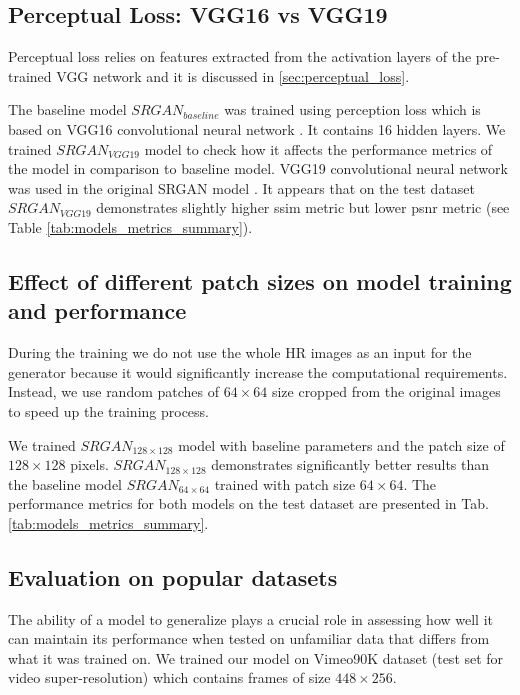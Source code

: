 \documentclass[conference]{IEEEtran}
\begin{document}
\subsection{Perceptual Loss: VGG16 vs VGG19 \label{sec:vgg_16_vs_19}}

Perceptual loss relies on features extracted from the activation layers of the pre-trained VGG network and it is discussed in \ref{sec:perceptual_loss}.

The baseline model $SRGAN_{baseline}$ was trained using perception loss which is based on VGG16 convolutional neural network \cite{vgg_very_deep_cnn_2014}. It contains 16 hidden layers. We trained $SRGAN_{VGG19}$ model to check how it affects the performance metrics of the model in comparison to baseline model. VGG19 convolutional neural network was used in the original SRGAN model \cite{srgan_2016}. It appears that on the test dataset\newline $SRGAN_{VGG19}$ demonstrates slightly higher \acrshort{ssim} metric but lower \acrshort{psnr} metric (see Table \ref{tab:models_metrics_summary}).

\subsection{Effect of different patch sizes on model training and performance}

During the training we do not use the whole HR images as an input for the generator because it would significantly increase the computational requirements. Instead, we use random patches of $64 \times 64$ size cropped from the original images to speed up the training process.

We trained $SRGAN_{128 \times 128}$ model with baseline parameters and the patch size of $128 \times 128$ pixels.  $SRGAN_{128 \times 128}$ demonstrates significantly better results than the baseline model $SRGAN_{64 \times 64}$ trained with patch size $64 \times 64$. The performance metrics for both models on the test dataset are presented in Tab. \ref{tab:models_metrics_summary}.

\subsection{Evaluation on popular datasets\label{sec:eval_on_datasets}}

The ability of a model to generalize plays a crucial role in assessing how well it can maintain its performance when tested on unfamiliar data that differs from what it was trained on. We trained our model on Vimeo90K dataset (test set for video super-resolution) \cite{vimeo90k_2019} which contains frames of size $448 \times 256$.
\end{document}
